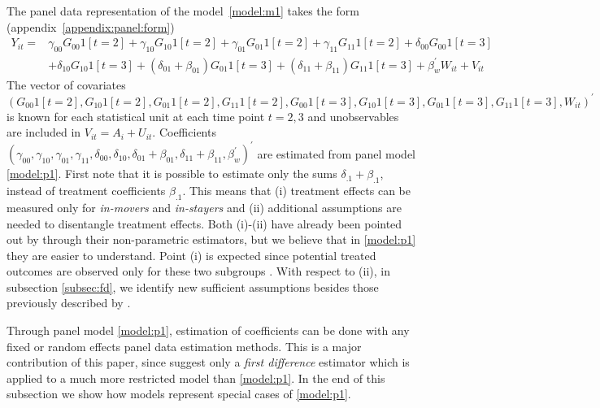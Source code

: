 \documentclass[12pt]{article}
\begin{document}
The panel data representation of the model~\ref{model:m1} takes the form (appendix~\ref{appendix:panel:form})
\begin{equation}\tag{$P_1$}
\label{model:p1}
\begin{split}
Y_{it}  = &\gamma_{00}G_{00}1[t=2] + \gamma_{10}G_{10}1[t=2] + \gamma_{01}G_{01}1[t=2] + \gamma_{11}G_{11}1[t=2] + \delta_{00}G_{00}1[t=3] \\
& + \delta_{10}G_{10}1[t=3] + (\delta_{01}+\beta_{01})G_{01}1[t=3] + (\delta_{11}+\beta_{11})G_{11}1[t=3] + \beta_w^\prime W_{it} + V_{it}
\end{split} 
\end{equation}
The vector of covariates $(G_{00}1[t=2],G_{10}1[t=2],G_{01}1[t=2],G_{11}1[t=2],G_{00}1[t=3],G_{10}1[t=3],G_{01}1[t=3],G_{11}1[t=3],W_{it})^\prime$ is known for each statistical unit at each time point $t=2,3$ and unobservables are included in $V_{it}=A_i+U_{it}$. Coefficients $(\gamma_{00},\gamma_{10},\gamma_{01},\gamma_{11},\delta_{00},\delta_{10},\delta_{01}+\beta_{01},\delta_{11}+\beta_{11},\beta_w^\prime)^\prime$ are estimated from panel model \ref{model:p1}. First note that it is possible to estimate only the sums $\delta_{.1}+\beta_{.1}$, instead of treatment coefficients $\beta_{.1}$. This means that (i) treatment effects can be measured only for \textit{in-movers} and \textit{in-stayers} and (ii) additional assumptions are needed to disentangle treatment effects. Both (i)-(ii) have already been pointed out by \cite{lee2014difference} through their non-parametric estimators, but we believe that in \ref{model:p1} they are easier to understand. Point (i) is expected since potential treated outcomes are observed only for these two subgroups \cite{lee2014difference}. With respect to (ii), in subsection \ref{subsec:fd}, we identify new sufficient assumptions besides those previously described by \cite{lee2014difference}.

Through panel model \ref{model:p1}, estimation of coefficients can be done with any fixed or random effects panel data estimation methods. This is a major contribution of this paper, since \cite{lee2014difference} suggest only a \textit{first difference} estimator which is applied to a much more restricted model than \ref{model:p1}. In the end of this subsection we show how \cite{lee2014difference} models represent special cases of \ref{model:p1}.
\end{document}
